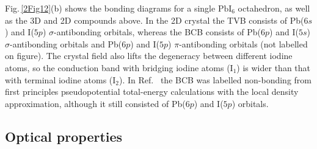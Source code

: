 Fig.\,\ref{2Fig12}(b) shows the bonding diagrams for a single $\textrm{PbI}_6$ octahedron, as well as the 3D and 2D compounds above. In the 2D crystal the TVB consists of Pb($6s$) and I($5p$) $\sigma$-antibonding orbitals, whereas the BCB consists of Pb($6p$) and I($5s$) $\sigma$-antibonding orbitals and Pb($6p$) and I($5p$) $\pi$-antibonding orbitals (not labelled on figure). The crystal field also lifts the degeneracy between different iodine atoms, so the conduction band with bridging iodine atoms ($\textrm{I}_1$) is wider than that with terminal iodine atoms ($\textrm{I}_2$). In Ref.\ \cite{Matsuishi2004} the BCB was labelled non-bonding from first principles pseudopotential total-energy calculations with the local density approximation, although it still consisted of Pb($6p$) and I($5p$) orbitals.

\subsection{Optical properties}
